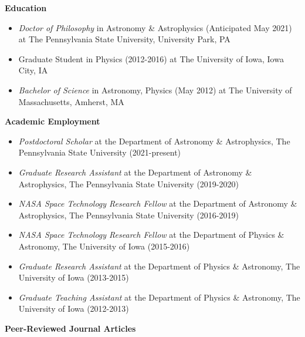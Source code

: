 
{\noindent \large \textbf{Education}}

\begin{itemize}[noitemsep]
 \item \emph{Doctor of Philosophy} in Astronomy \& Astrophysics (Anticipated May 2021) at The Pennsylvania State University, University Park, PA
 \item Graduate Student in Physics (2012-2016) at The University of Iowa, Iowa City, IA 
 \item \emph{Bachelor of Science} in Astronomy, Physics (May 2012) at The University of Massachusetts, Amherst, MA 
 \end{itemize}

{\noindent \large \textbf{Academic Employment}}

\begin{itemize}[noitemsep]
 \item \emph{Postdoctoral Scholar} at the Department of Astronomy \& Astrophysics, The Pennsylvania State University (2021-present)
 \item \emph{Graduate Research Assistant} at the Department of Astronomy \& Astrophysics, The Pennsylvania State University (2019-2020)
 \item \emph{NASA Space Technology Research Fellow} at the Department of Astronomy \& Astrophysics, The Pennsylvania State University (2016-2019)
 \item \emph{NASA Space Technology Research Fellow} at the Department of Physics \& Astronomy, The University of Iowa (2015-2016)
 \item \emph{Graduate Research Assistant} at the Department of Physics \& Astronomy, The University of Iowa (2013-2015)
 \item \emph{Graduate Teaching Assistant} at the Department of Physics \& Astronomy, The University of Iowa (2012-2013)
 \end{itemize}

{\noindent \large \textbf{Peer-Reviewed Journal Articles}}

